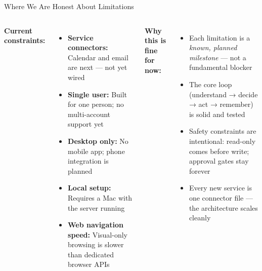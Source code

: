 \documentclass[aspectratio=169,11pt]{beamer}
\begin{document}
\begin{frame}{Where We Are Honest About Limitations}
  \begin{columns}[T]
    {\color{accentcol}\bfseries Current constraints:}
    \begin{itemize}\small
      \item \textbf{Service connectors:} Calendar and email are next — not yet wired
      \item \textbf{Single user:} Built for one person; no multi-account support yet
      \item \textbf{Desktop only:} No mobile app; phone integration is planned
      \item \textbf{Local setup:} Requires a Mac with the server running
      \item \textbf{Web navigation speed:} Visual-only browsing is slower than
            dedicated browser APIs
    \end{itemize}

    {\color{accentcol}\bfseries Why this is fine for now:}
    \begin{itemize}\small
      \item Each limitation is a \emph{known, planned milestone} — not a
            fundamental blocker
      \item The core loop (understand → decide → act → remember) is solid
            and tested
      \item Safety constraints are intentional: read-only comes before write;
            approval gates stay forever
      \item Every new service is one connector file — the architecture
            scales cleanly
    \end{itemize}
  \end{columns}
\end{frame}
\end{document}
